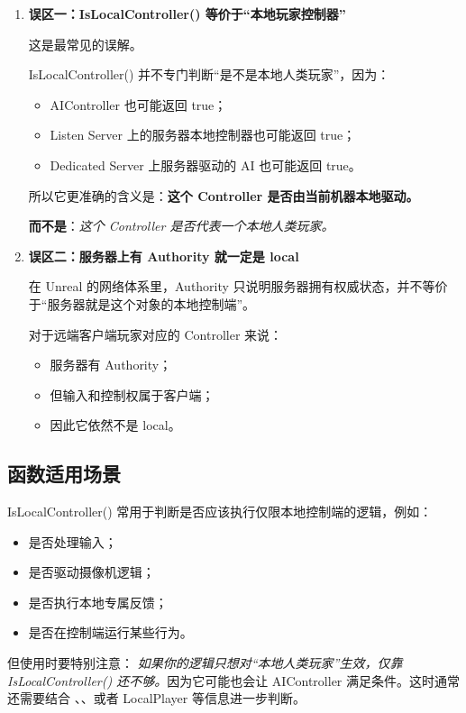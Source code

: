 \begin{enumerate}
	\item \textbf{误区一：IsLocalController() 等价于“本地玩家控制器”}\cuo 
	
	这是最常见的误解。
	
	IsLocalController() 并不专门判断“是不是本地人类玩家”，因为：
	
	\begin{itemize}
		\item AIController 也可能返回 true；
		\item Listen Server 上的服务器本地控制器也可能返回 true；
		\item Dedicated Server 上服务器驱动的 AI 也可能返回 true。
	\end{itemize}
	
	所以它更准确的含义是：\textbf{这个 Controller 是否由当前机器本地驱动。}
	
	\textbf{而不是}：\emph{这个 Controller 是否代表一个本地人类玩家。}
	
	\item \textbf{误区二：服务器上有 Authority 就一定是 local}\cuo 
	
	
	
	在 Unreal 的网络体系里，Authority 只说明服务器拥有权威状态，并不等价于“服务器就是这个对象的本地控制端”。
	
	对于远端客户端玩家对应的 Controller 来说：
	
	\begin{itemize}
		\item 服务器有 Authority；
		\item 但输入和控制权属于客户端；
		\item 因此它依然不是 local。
	\end{itemize}
\end{enumerate}

\subsection{函数适用场景}

IsLocalController() 常用于判断是否应该执行仅限本地控制端的逻辑，例如：
\begin{itemize}
	\item 是否处理输入；
	\item 是否驱动摄像机逻辑；
	\item 是否执行本地专属反馈；
	\item 是否在控制端运行某些行为。
\end{itemize}
但使用时要特别注意：	\emph{如果你的逻辑只想对“本地人类玩家”生效，仅靠 IsLocalController() 还不够。}因为它可能也会让 AIController 满足条件。这时通常还需要结合 、、或者 LocalPlayer 等信息进一步判断。

